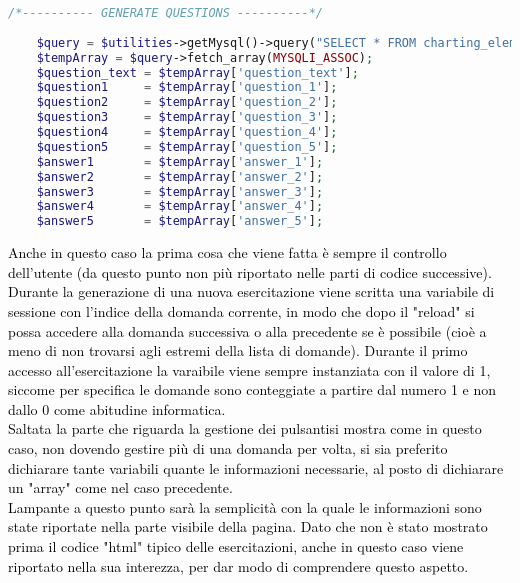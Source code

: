 \begin{lstlisting}[language=php]
	/*---------- GENERATE QUESTIONS ----------*/
	
	$query = $utilities->getMysql()->query("SELECT * FROM charting_elements WHERE (id = '{$_SESSION['numbers']}')");
	$tempArray = $query->fetch_array(MYSQLI_ASSOC);
	$question_text = $tempArray['question_text'];
	$question1     = $tempArray['question_1'];
	$question2     = $tempArray['question_2'];
	$question3     = $tempArray['question_3'];
	$question4     = $tempArray['question_4'];
	$question5     = $tempArray['question_5'];
	$answer1       = $tempArray['answer_1'];
	$answer2       = $tempArray['answer_2'];
	$answer3       = $tempArray['answer_3'];
	$answer4       = $tempArray['answer_4'];
	$answer5       = $tempArray['answer_5'];
\end{lstlisting}

\raggedright
\textcolor{black}{Anche in questo caso la prima cosa che viene fatta è sempre il controllo dell'utente (da questo punto non più riportato nelle parti di codice successive).  Durante la generazione di una nuova esercitazione viene scritta una variabile di sessione con l'indice della domanda corrente, in modo che dopo il "reload" si possa accedere alla domanda successiva o alla precedente se è possibile (cioè a meno di non trovarsi agli estremi della lista di domande). Durante il primo accesso all'esercitazione la varaibile viene sempre instanziata con il valore di 1, siccome per specifica le domande sono conteggiate a partire dal numero 1 e non dallo 0 come abitudine informatica.\\
Saltata la parte che riguarda la gestione dei pulsantisi mostra come in questo caso, non dovendo gestire più di una domanda per volta,  si sia preferito dichiarare tante variabili quante le informazioni necessarie, al posto di dichiarare un "array" come nel caso precedente.\\
Lampante a questo punto sarà la semplicità con la quale le informazioni sono state riportate nella parte visibile della pagina. Dato che non è stato mostrato prima il codice "html" tipico delle esercitazioni, anche in questo caso viene riportato nella sua interezza, per dar modo di comprendere questo aspetto.}\\

